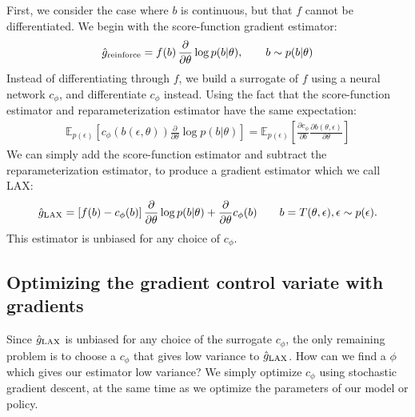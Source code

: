 \documentclass{article}
\newcommand{\E}{\mathbb{E}}
\newcommand{\PT}{\frac{\partial}{\partial \theta}}
\newcommand{\LP}[1]{\PT \log p(#1)}
\newcommand{\LAX}{{\textnormal{LAX}}}
\newcommand{\RELAX}{{\textnormal{RELAX}}}
\begin{document}
First, we consider the case where $b$ is continuous, but that $f$ cannot be differentiated.
We begin with the score-function gradient estimator:
%
\begin{align}
\hat g_\textnormal{reinforce} = f \! \left( b \right) \PT \log p(b | \theta), \qquad b \sim p(b|\theta)
\end{align}
%
Instead of differentiating through $f$, we build a surrogate of $f$ using a neural network $c_\phi$, and differentiate $c_\phi$ instead.
Using the fact that the score-function estimator and reparameterization estimator have the same expectation:
%
\begin{align}
\E_{p(\epsilon)} \left[ c_\phi ( b(\epsilon, \theta)) \PT \log p(b | \theta) \right] =
\E_{p(\epsilon)} \left[ \frac{\partial c_\phi}{\partial b} \frac{\partial b(\theta, \epsilon)}{\partial \theta} \right]
\end{align}
%
%
We can simply add the score-function estimator and subtract the reparameterization estimator, to produce a gradient estimator which we call LAX:
%
\begin{align}
\label{eq:cont_est}
\hat g_\LAX = \left[ f(b) -c_\phi(b) \right] \PT \log p(b|\theta) + \PT c_\phi(b) \qquad b = T(\theta, \epsilon), \epsilon \sim p(\epsilon).
\end{align}
%
This estimator is unbiased for any choice of $c_\phi$.


\subsection{Optimizing the gradient control variate with gradients}

Since $\hat g_\LAX$ is unbiased for any choice of the surrogate $c_\phi$, the only remaining problem is to choose a $c_\phi$ that gives low variance to $\hat g_\LAX$.
How can we find a $\phi$ which gives our estimator low variance?
We simply optimize $c_\phi$ using stochastic gradient descent, at the same time as we optimize the parameters of our model or policy.
\end{document}
